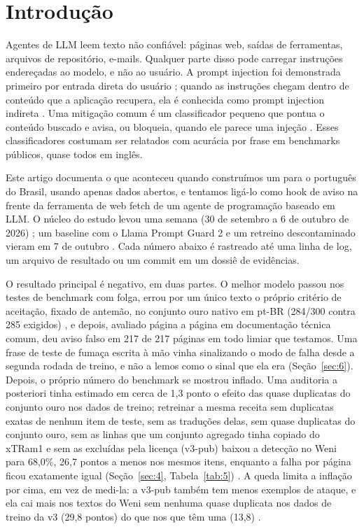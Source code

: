 \documentclass[11pt]{article}
\begin{document}
\section{Introdução}\label{sec:1}

Agentes de LLM leem texto não confiável: páginas web, saídas de ferramentas, arquivos de repositório, e-mails. Qualquer parte disso pode carregar instruções endereçadas ao modelo, e não ao usuário. A prompt injection foi demonstrada primeiro por entrada direta do usuário \citep{perez2022ignore}; quando as instruções chegam dentro de conteúdo que a aplicação recupera, ela é conhecida como prompt injection indireta \citep{greshake2023indirect, liu2024formalizing}. Uma mitigação comum é um classificador pequeno que pontua o conteúdo buscado e avisa, ou bloqueia, quando ele parece uma injeção \citep{protectai2024deberta, meta2025promptguard2, jacob2025promptshield}. Esses classificadores costumam ser relatados com acurácia por frase em benchmarks públicos, quase todos em inglês.

Este artigo documenta o que aconteceu quando construímos um para o português do Brasil, usando apenas dados abertos, e tentamos ligá-lo como hook de aviso na frente da ferramenta de web fetch de um agente de programação baseado em LLM. O núcleo do estudo levou uma semana (30 de setembro a 6 de outubro de 2026)%
; um baseline com o Llama Prompt Guard 2 e um retreino descontaminado vieram em 7 de outubro%
. Cada número abaixo é rastreado até uma linha de log, um arquivo de resultado ou um commit em um dossiê de evidências.

O resultado principal é negativo, em duas partes. O melhor modelo passou nos testes de benchmark com folga, errou por um único texto o próprio critério de aceitação, fixado de antemão, no conjunto ouro nativo em pt-BR (284/300 contra 285 exigidos)%
, e depois, avaliado página a página em documentação técnica comum, deu aviso falso em 217 de 217 páginas %
em todo limiar que testamos. Uma frase de teste de fumaça escrita à mão vinha sinalizando o modo de falha desde a segunda rodada de treino, e não a lemos como o sinal que ela era (Seção~\ref{sec:6}). Depois, o próprio número do benchmark se mostrou inflado. Uma auditoria a posteriori tinha estimado em cerca de 1,3 ponto o efeito das quase duplicatas do conjunto ouro nos dados de treino; retreinar a mesma receita sem duplicatas exatas de nenhum item de teste, sem as traduções delas, sem quase duplicatas do conjunto ouro, sem as linhas que um conjunto agregado tinha copiado do xTRam1 e sem as excluídas pela licença (v3-pub) baixou a detecção no Weni para 68,0\%, 26,7 pontos a menos nos mesmos itens, enquanto a falha por página ficou exatamente igual (Seção~\ref{sec:4}, Tabela~\ref{tab:5})%
. A queda limita a inflação por cima, em vez de medi-la: a v3-pub também tem menos exemplos de ataque, e ela cai mais nos textos do Weni sem nenhuma quase duplicata nos dados de treino da v3 (29,8 pontos) do que nos que têm uma (13,8)%
.
\end{document}
